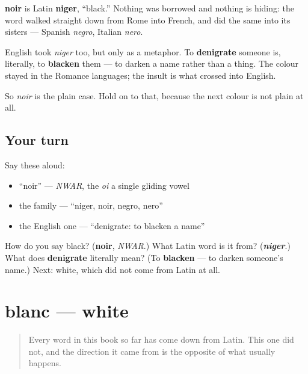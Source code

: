 \begin{cousinweb}
\textbf{noir} is Latin \textbf{niger}, \textquotedblleft{}black.\textquotedblright{} Nothing was borrowed and nothing is hiding: the word walked straight down from Rome into French, and did the same into its sisters — Spanish \emph{negro}, Italian \emph{nero}.

English took \emph{niger} too, but only as a metaphor. To \textbf{denigrate} someone is, literally, to \textbf{blacken} them — to darken a name rather than a thing. The colour stayed in the Romance languages; the insult is what crossed into English.

So \emph{noir} is the plain case. Hold on to that, because the next colour is not plain at all.
\end{cousinweb}

\subsection*{Your turn}
Say these aloud:

\begin{itemize}
\raggedright
  \item \textquotedblleft{}noir\textquotedblright{} — \emph{NWAR}, the \emph{oi} a single gliding vowel
  \item the family — \textquotedblleft{}niger, noir, negro, nero\textquotedblright{}
  \item the English one — \textquotedblleft{}denigrate: to blacken a name\textquotedblright{}
\end{itemize}

\begin{tcolorbox}[breakable,colback=teal!4,colframe=teal!35!black,title={Before you move on}]
How do you say black? (\textbf{noir}, \emph{NWAR}.) What Latin word is it from? (\emph{\textbf{niger}}.) What does \textbf{denigrate} literally mean? (To \textbf{blacken} — to darken someone's name.) Next: white, which did not come from Latin at all.
\end{tcolorbox}
\section[blanc]{blanc — white}

\label{lesson:FR-C13-blanc}



\begin{quote}
Every word in this book so far has come down from Latin. This one did not, and the direction it came from is the opposite of what usually happens.
\end{quote}

